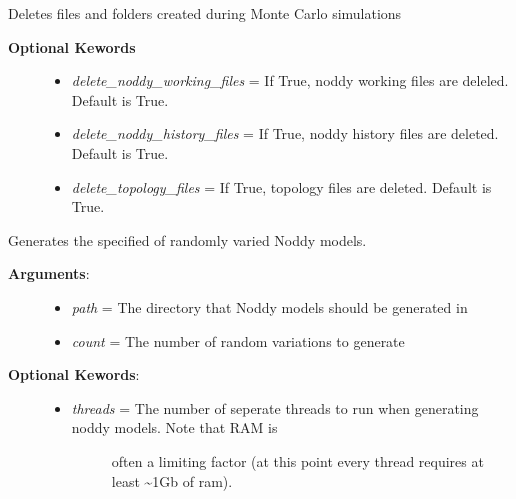 \documentclass[a4paper,10pt,english]{sphinxmanual}
\begin{document}
\begin{fulllineitems}
\begin{fulllineitems}
\end{fulllineitems}


\begin{fulllineitems}
\label{pynoddy:pynoddy.experiment.MonteCarlo.MonteCarlo.cleanup}
Deletes files and folders created during Monte Carlo simulations
\begin{description}
\item[{\textbf{Optional Kewords}}] \leavevmode\begin{itemize}
\item {} 
\emph{delete\_noddy\_working\_files} = If True, noddy working files are deleled. Default is True.

\item {} 
\emph{delete\_noddy\_history\_files} = If True, noddy history files are deleted. Default is True.

\item {} 
\emph{delete\_topology\_files} = If True, topology files are deleted. Default is True.

\end{itemize}

\end{description}

\end{fulllineitems}


\begin{fulllineitems}
\label{pynoddy:pynoddy.experiment.MonteCarlo.MonteCarlo.generate_model_instances}
Generates the specified of randomly varied Noddy models.
\begin{description}
\item[{\textbf{Arguments}:}] \leavevmode\begin{itemize}
\item {} 
\emph{path} = The directory that Noddy models should be generated in

\item {} 
\emph{count} = The number of random variations to generate

\end{itemize}

\item[{\textbf{Optional Kewords}:}] \leavevmode\begin{itemize}
\item {} \begin{description}
\item[{\emph{threads} = The number of seperate threads to run when generating noddy models. Note that RAM is }] \leavevmode
often a limiting factor (at this point every thread requires at least \textasciitilde{}1Gb of ram).


\end{description}
\end{itemize}
\end{description}
\end{fulllineitems}
\end{fulllineitems}
\end{document}
